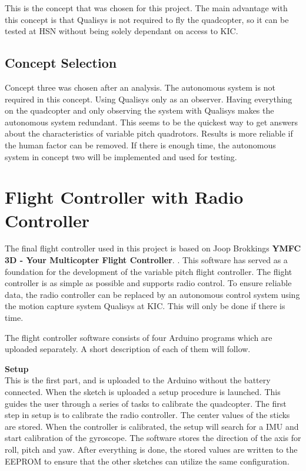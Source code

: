 This is the concept that was chosen for this project. The main advantage with this concept is that Qualisys is not required to fly the quadcopter, so it can be tested at HSN without being solely dependant on access to KIC. \bigskip


\subsection{Concept Selection}

Concept three was chosen after an analysis. The autonomous system is not required in this concept. Using Qualisys only as an observer. Having everything on the quadcopter and only observing the system with Qualisys makes the autonomous system redundant. This seems to be the quickest way to get answers about the characteristics of variable pitch quadrotors. Results is more reliable if the human factor can be removed. If there is enough time, the autonomous system in concept two will be implemented and used for testing.



\section{Flight Controller with Radio Controller}

The final flight controller used in this project is based on Joop Brokkings \textbf{YMFC 3D - Your Multicopter Flight Controller}. \cite{joop}. This software has served as a foundation for the development of the variable pitch flight controller. The flight controller is as simple as possible and supports radio control. To ensure reliable data, the radio controller can be replaced by an autonomous control system using the motion capture system Qualisys at KIC. This will only be done if there is time. \bigskip

The flight controller software consists of four Arduino programs which are uploaded separately. A short description of each of them will follow.\bigskip

\textbf{Setup}\\
This is the first part, and is uploaded to the Arduino without the battery connected. When the sketch is uploaded a setup procedure is launched. This guides the user through a series of tasks to calibrate the quadcopter. The first step in setup is to calibrate the radio controller. The center values of the sticks are stored.
When the controller is calibrated, the setup will search for a IMU and start calibration of the gyroscope. The software stores the direction of the axis for roll, pitch and yaw. After everything is done, the stored values are written to the EEPROM to ensure that the other sketches can utilize the same configuration. \bigskip

